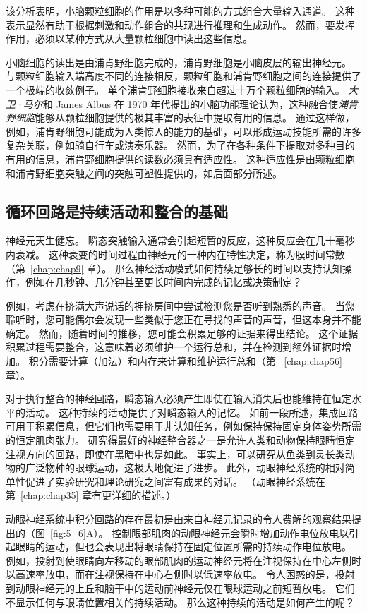 该分析表明，小脑颗粒细胞的作用是以多种可能的方式组合大量输入通道。
这种表示显然有助于根据刺激和动作组合的共现进行推理和生成动作。
然而，要发挥作用，必须以某种方式从大量颗粒细胞中读出这些信息。


小脑细胞的读出是由浦肯野细胞完成的，浦肯野细胞是小脑皮层的输出神经元。
与颗粒细胞输入端高度不同的连接相反，颗粒细胞和浦肯野细胞之间的连接提供了一个极端的收敛例子。
单个浦肯野细胞接收来自超过十万个颗粒细胞的输入。
\textit{大卫·马尔}和 James Albus 在 1970 年代提出的小脑功能理论认为，这种融合使\textit{浦肯野细胞}能够从颗粒细胞提供的极其丰富的表征中提取有用的信息。
通过这样做，例如，浦肯野细胞可能成为人类惊人的能力的基础，可以形成运动技能所需的许多复杂关联，例如骑自行车或演奏乐器。
然而，为了在各种条件下提取对多种目的有用的信息，浦肯野细胞提供的读数必须具有适应性。
这种适应性是由颗粒细胞和浦肯野细胞突触之间的突触可塑性提供的，如后面部分所述。



\subsection{循环回路是持续活动和整合的基础}

神经元天生健忘。 
瞬态突触输入通常会引起短暂的反应，这种反应会在几十毫秒内衰减。
这种衰变的时间过程由神经元的一种内在特性决定，称为膜时间常数（第~\ref{chap:chap9} 章）。
那么神经活动模式如何持续足够长的时间以支持认知操作，例如在几秒钟、几分钟甚至更长时间内完成的记忆或决策制定？


例如，考虑在挤满大声说话的拥挤房间中尝试检测您是否听到熟悉的声音。
当您聆听时，您可能偶尔会发现一些类似于您正在寻找的声音的声音，但这本身并不能确定。
然而，随着时间的推移，您可能会积累足够的证据来得出结论。
这个证据积累过程需要整合，这意味着必须维护一个运行总和，并在检测到额外证据时增加。
积分需要计算（加法）和内存来计算和维护运行总和（第 ~\ref{chap:chap56} 章）。


对于执行整合的神经回路，瞬态输入必须产生即使在输入消失后也能维持在恒定水平的活动。
这种持续的活动提供了对瞬态输入的记忆。
如前一段所述，集成回路可用于积累信息，但它们也需要用于非认知任务，例如保持保持固定身体姿势所需的恒定肌肉张力。
研究得最好的神经整合器之一是允许人类和动物保持眼睛恒定注视方向的回路，即使在黑暗中也是如此。
事实上，可以研究从鱼类到灵长类动物的广泛物种的眼球运动，这极大地促进了进步。
此外，动眼神经系统的相对简单性促进了实验研究和理论研究之间富有成果的对话。
（动眼神经系统在第~\ref{chap:chap35} 章有更详细的描述。）


动眼神经系统中积分回路的存在最初是由来自神经元记录的令人费解的观察结果提出的（图~\ref{fig:5_6}A）。
控制眼部肌肉的动眼神经元会瞬时增加动作电位放电以引起眼睛的运动，但也会表现出将眼睛保持在固定位置所需的持续动作电位放电。
例如，投射到使眼睛向左移动的眼部肌肉的运动神经元将在注视保持在中心左侧时以高速率放电，而在注视保持在中心右侧时以低速率放电。
令人困惑的是，投射到动眼神经元的上丘和脑干中的运动前神经元仅在眼球运动之前短暂放电。
它们不显示任何与眼睛位置相关的持续活动。
那么这种持续的活动是如何产生的呢？


